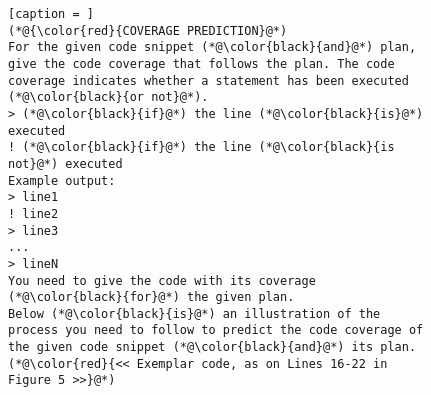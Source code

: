 \begin{figure}[t]




\begin{minipage}{.45\textwidth}        
\begin{lstlisting}[caption = ]
(*@{\color{red}{COVERAGE PREDICTION}@*)
For the given code snippet (*@\color{black}{and}@*) plan, give the code coverage that follows the plan. The code coverage indicates whether a statement has been executed (*@\color{black}{or not}@*). 
> (*@\color{black}{if}@*) the line (*@\color{black}{is}@*) executed
! (*@\color{black}{if}@*) the line (*@\color{black}{is not}@*) executed
Example output:
> line1
! line2
> line3
...
> lineN
You need to give the code with its coverage (*@\color{black}{for}@*) the given plan.
Below (*@\color{black}{is}@*) an illustration of the process you need to follow to predict the code coverage of the given code snippet (*@\color{black}{and}@*) its plan. 
(*@\color{red}{<< Exemplar code, as on Lines 16-22 in Figure 5 >>}@*) 


\end{lstlisting}
\end{minipage}
\end{figure}
